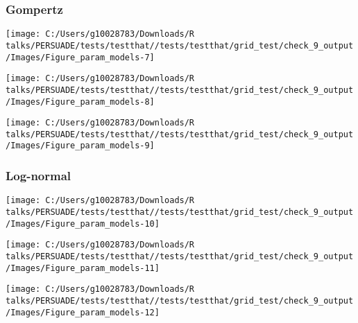 \documentclass[
]{article}
\begin{document}
\clearpage

\subsubsection{Gompertz}\label{gompertz}

\begin{flushleft}\texttt{[image: C:/Users/g10028783/Downloads/R talks/PERSUADE/tests/testthat//tests/testthat/grid\_test/check\_9\_output/Images/Figure\_param\_models-7]} \end{flushleft}

\begin{flushleft}\texttt{[image: C:/Users/g10028783/Downloads/R talks/PERSUADE/tests/testthat//tests/testthat/grid\_test/check\_9\_output/Images/Figure\_param\_models-8]} \end{flushleft}

\begin{flushleft}\texttt{[image: C:/Users/g10028783/Downloads/R talks/PERSUADE/tests/testthat//tests/testthat/grid\_test/check\_9\_output/Images/Figure\_param\_models-9]} \end{flushleft}

\clearpage

\subsubsection{Log-normal}\label{log-normal}

\begin{flushleft}\texttt{[image: C:/Users/g10028783/Downloads/R talks/PERSUADE/tests/testthat//tests/testthat/grid\_test/check\_9\_output/Images/Figure\_param\_models-10]} \end{flushleft}

\begin{flushleft}\texttt{[image: C:/Users/g10028783/Downloads/R talks/PERSUADE/tests/testthat//tests/testthat/grid\_test/check\_9\_output/Images/Figure\_param\_models-11]} \end{flushleft}

\begin{flushleft}\texttt{[image: C:/Users/g10028783/Downloads/R talks/PERSUADE/tests/testthat//tests/testthat/grid\_test/check\_9\_output/Images/Figure\_param\_models-12]} \end{flushleft}

\clearpage
\end{document}
